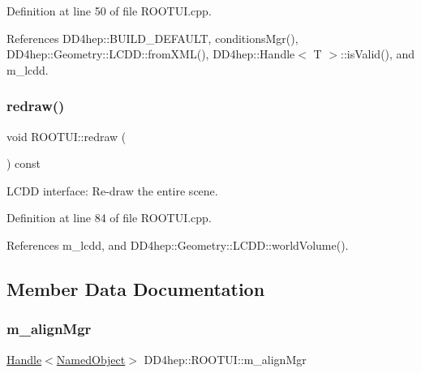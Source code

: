 Definition at line 50 of file R\+O\+O\+T\+U\+I.\+cpp.



References D\+D4hep\+::\+B\+U\+I\+L\+D\+\_\+\+D\+E\+F\+A\+U\+LT, conditions\+Mgr(), D\+D4hep\+::\+Geometry\+::\+L\+C\+D\+D\+::from\+X\+M\+L(), D\+D4hep\+::\+Handle$<$ T $>$\+::is\+Valid(), and m\+\_\+lcdd.

\hypertarget{class_d_d4hep_1_1_r_o_o_t_u_i_add931e9648b58abc61034adb173295d3}{}\label{class_d_d4hep_1_1_r_o_o_t_u_i_add931e9648b58abc61034adb173295d3} 
\subsubsection{\texorpdfstring{redraw()}{redraw()}}
{\footnotesize\ttfamily void R\+O\+O\+T\+U\+I\+::redraw (\begin{DoxyParamCaption}{ }\end{DoxyParamCaption}) const\hspace{0.3cm}{\ttfamily [virtual]}}



L\+C\+DD interface\+: Re-\/draw the entire scene. 



Definition at line 84 of file R\+O\+O\+T\+U\+I.\+cpp.



References m\+\_\+lcdd, and D\+D4hep\+::\+Geometry\+::\+L\+C\+D\+D\+::world\+Volume().



\subsection{Member Data Documentation}
\hypertarget{class_d_d4hep_1_1_r_o_o_t_u_i_a4e3cba5482c1e2fa75291a27437d039b}{}\label{class_d_d4hep_1_1_r_o_o_t_u_i_a4e3cba5482c1e2fa75291a27437d039b} 
\subsubsection{\texorpdfstring{m\+\_\+align\+Mgr}{m\_alignMgr}}
{\footnotesize\ttfamily \hyperlink{class_d_d4hep_1_1_handle}{Handle}$<$\hyperlink{class_d_d4hep_1_1_named_object}{Named\+Object}$>$ D\+D4hep\+::\+R\+O\+O\+T\+U\+I\+::m\+\_\+align\+Mgr\hspace{0.3cm}{\ttfamily [protected]}}



